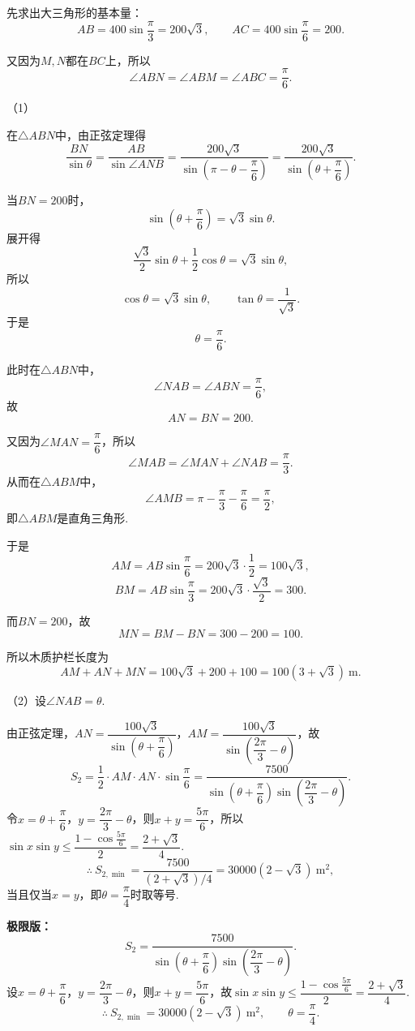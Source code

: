 \documentclass[CJKmath,10pt,a4paper]{exam-zh}
\begin{document}
\begin{solution}
	先求出大三角形的基本量：
	\[
	AB=400\sin\dfrac{\pi}{3}=200\sqrt3,
	\qquad
	AC=400\sin\dfrac{\pi}{6}=200.
	\]

	又因为$M,N$都在$BC$上，所以
	\[
	\angle ABN=\angle ABM=\angle ABC=\dfrac{\pi}{6}.
	\]

	（1）

	在$\triangle ABN$中，由正弦定理得
	\[
	\dfrac{BN}{\sin\theta}=\dfrac{AB}{\sin\angle ANB}
	=\dfrac{200\sqrt3}{\sin\left(\pi-\theta-\dfrac{\pi}{6}\right)}
	=\dfrac{200\sqrt3}{\sin\left(\theta+\dfrac{\pi}{6}\right)}.
	\]

	当$BN=200$时，
	\[
	\sin\left(\theta+\dfrac{\pi}{6}\right)=\sqrt3\sin\theta.
	\]
	展开得
	\[
	\dfrac{\sqrt3}{2}\sin\theta+\dfrac12\cos\theta=\sqrt3\sin\theta,
	\]
	所以
	\[
	\cos\theta=\sqrt3\sin\theta,
	\qquad
	\tan\theta=\dfrac{1}{\sqrt3}.
	\]
	于是
	\[
	\theta=\dfrac{\pi}{6}.
	\]

	此时在$\triangle ABN$中，
	\[
	\angle NAB=\angle ABN=\dfrac{\pi}{6},
	\]
	故
	\[
	AN=BN=200.
	\]

	又因为$\angle MAN=\dfrac{\pi}{6}$，所以
	\[
	\angle MAB=\angle MAN+\angle NAB=\dfrac{\pi}{3}.
	\]
	从而在$\triangle ABM$中，
	\[
	\angle AMB=\pi-\dfrac{\pi}{3}-\dfrac{\pi}{6}=\dfrac{\pi}{2},
	\]
	即$\triangle ABM$是直角三角形.

	于是
	\[
	AM=AB\sin\dfrac{\pi}{6}=200\sqrt3\cdot\dfrac12=100\sqrt3,
	\]
	\[
	BM=AB\sin\dfrac{\pi}{3}=200\sqrt3\cdot\dfrac{\sqrt3}{2}=300.
	\]

	而$BN=200$，故
	\[
	MN=BM-BN=300-200=100.
	\]

	所以木质护栏长度为
	\[
	AM+AN+MN=100\sqrt3+200+100=100(3+\sqrt3)\ \text{m}.
	\]

	（2）设$\angle NAB=\theta$.

	由正弦定理，$AN=\dfrac{100\sqrt3}{\sin\left(\theta+\dfrac{\pi}{6}\right)}$，$AM=\dfrac{100\sqrt3}{\sin\left(\dfrac{2\pi}{3}-\theta\right)}$，故
	\[
	S_2=\dfrac12\cdot AM\cdot AN\cdot\sin\dfrac{\pi}{6}=\dfrac{7500}{\sin\left(\theta+\dfrac{\pi}{6}\right)\sin\left(\dfrac{2\pi}{3}-\theta\right)}.
	\]
	令$x=\theta+\dfrac{\pi}{6}$，$y=\dfrac{2\pi}{3}-\theta$，则$x+y=\dfrac{5\pi}{6}$，所以$\sin x\sin y\le \dfrac{1-\cos\frac{5\pi}{6}}{2}=\dfrac{2+\sqrt3}{4}$.
	\[
	\therefore\ S_{2,\min}=\dfrac{7500}{(2+\sqrt3)/4}=30000(2-\sqrt3)\ \text{m}^2,
	\]
	当且仅当$x=y$，即$\theta=\dfrac{\pi}{4}$时取等号.

	\textbf{极限版：}
	\[
	S_2=\dfrac{7500}{\sin\left(\theta+\dfrac{\pi}{6}\right)\sin\left(\dfrac{2\pi}{3}-\theta\right)}.
	\]
	设$x=\theta+\dfrac{\pi}{6}$，$y=\dfrac{2\pi}{3}-\theta$，则$x+y=\dfrac{5\pi}{6}$，故$\sin x\sin y\le \dfrac{1-\cos\frac{5\pi}{6}}{2}=\dfrac{2+\sqrt3}{4}$.
	\[
	\therefore\ S_{2,\min}=30000(2-\sqrt3)\ \text{m}^2,
	\qquad \theta=\dfrac{\pi}{4}.
	\]
\end{solution}
\end{document}
